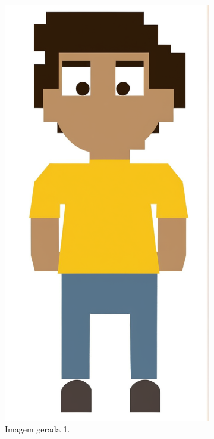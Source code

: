 \begin{figure}[htbp]
\begin{subfigure}{0.15\linewidth}
        \includegraphics[width=1\linewidth]{figs/cgDream/res_img_jug2a.png}
        \caption{\small Imagem gerada 1.}
        \label{fig:cgDream2b}
    \end{subfigure}
    \begin{subfigure}{0.15\linewidth}

\end{subfigure}
\end{figure}
